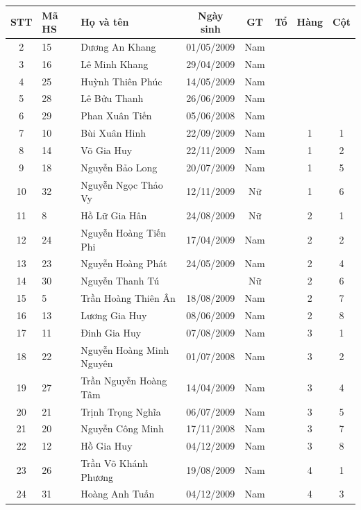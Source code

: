 \begin{longtable}{|c|l|p{5cm}|c|c|c|c|c|}
\hline
STT & Mã HS & Họ và tên & Ngày sinh & GT & Tổ & Hàng & Cột \\
\hline
2 & 15 & Dương An Khang & 01/05/2009 & Nam &  &  &  \\
\hline
3 & 16 & Lê Minh Khang & 29/04/2009 & Nam &  &  &  \\
\hline
4 & 25 & Huỳnh Thiên Phúc & 14/05/2009 & Nam &  &  &  \\
\hline
5 & 28 & Lê Bửu Thanh & 26/06/2009 & Nam &  &  &  \\
\hline
6 & 29 & Phan Xuân Tiến & 05/06/2008 & Nam &  &  &  \\
\hline
7 & 10 & Bùi Xuân Hinh & 22/09/2009 & Nam &  & 1 & 1 \\
\hline
8 & 14 & Võ Gia Huy & 22/11/2009 & Nam &  & 1 & 2 \\
\hline
9 & 18 & Nguyễn Bảo Long & 20/07/2009 & Nam &  & 1 & 5 \\
\hline
10 & 32 & Nguyễn Ngọc Thảo Vy & 12/11/2009 & Nữ &  & 1 & 6 \\
\hline
11 & 8 & Hồ Lữ Gia Hân & 24/08/2009 & Nữ &  & 2 & 1 \\
\hline
12 & 24 & Nguyễn Hoàng Tiến Phi & 17/04/2009 & Nam &  & 2 & 2 \\
\hline
13 & 23 & Nguyễn Hoàng Phát & 24/05/2009 & Nam &  & 2 & 4 \\
\hline
14 & 30 & Nguyễn Thanh Tú &  & Nữ &  & 2 & 6 \\
\hline
15 & 5 & Trần Hoàng Thiên Ân & 18/08/2009 & Nam &  & 2 & 7 \\
\hline
16 & 13 & Lương Gia Huy & 08/06/2009 & Nam &  & 2 & 8 \\
\hline
17 & 11 & Đinh Gia Huy & 07/08/2009 & Nam &  & 3 & 1 \\
\hline
18 & 22 & Nguyễn Hoàng Minh Nguyên & 01/07/2008 & Nam &  & 3 & 2 \\
\hline
19 & 27 & Trần Nguyễn Hoàng Tâm & 14/04/2009 & Nam &  & 3 & 4 \\
\hline
20 & 21 & Trịnh Trọng Nghĩa & 06/07/2009 & Nam &  & 3 & 5 \\
\hline
21 & 20 & Nguyễn Công Minh & 17/11/2008 & Nam &  & 3 & 7 \\
\hline
22 & 12 & Hồ Gia Huy & 04/12/2009 & Nam &  & 3 & 8 \\
\hline
23 & 26 & Trần Võ Khánh Phương & 19/08/2009 & Nam &  & 4 & 1 \\
\hline
24 & 31 & Hoàng Anh Tuấn & 04/12/2009 & Nam &  & 4 & 3 \\

\end{longtable}
